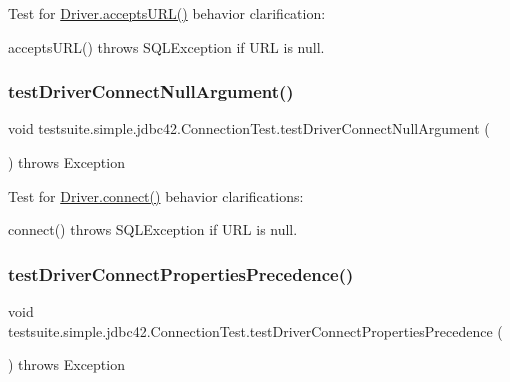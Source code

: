 Test for \mbox{\hyperlink{classcom_1_1mysql_1_1jdbc_1_1_non_registering_driver_abe7a0b5bf395ae24c4346d6bab87a0be}{Driver.\+accepts\+U\+R\+L()}} behavior clarification\+:
\begin{DoxyItemize}
\item accepts\+U\+R\+L() throws S\+Q\+L\+Exception if U\+RL is null. 
\end{DoxyItemize}\mbox{\label{classtestsuite_1_1simple_1_1jdbc42_1_1_connection_test_a5919b756ab01d1c7005836699721ee8f}} 
\subsubsection{\texorpdfstring{test\+Driver\+Connect\+Null\+Argument()}{testDriverConnectNullArgument()}}
{\footnotesize\ttfamily void testsuite.\+simple.\+jdbc42.\+Connection\+Test.\+test\+Driver\+Connect\+Null\+Argument (\begin{DoxyParamCaption}{ }\end{DoxyParamCaption}) throws Exception}

Test for \mbox{\hyperlink{classcom_1_1mysql_1_1jdbc_1_1_non_registering_driver_a834c012e752a01d1ee435b3461bb8218}{Driver.\+connect()}} behavior clarifications\+:
\begin{DoxyItemize}
\item connect() throws S\+Q\+L\+Exception if U\+RL is null. 
\end{DoxyItemize}\mbox{\label{classtestsuite_1_1simple_1_1jdbc42_1_1_connection_test_a97dbec29a9c35d9c5cb8e79373da3867}} 
\subsubsection{\texorpdfstring{test\+Driver\+Connect\+Properties\+Precedence()}{testDriverConnectPropertiesPrecedence()}}
{\footnotesize\ttfamily void testsuite.\+simple.\+jdbc42.\+Connection\+Test.\+test\+Driver\+Connect\+Properties\+Precedence (\begin{DoxyParamCaption}{ }\end{DoxyParamCaption}) throws Exception}

